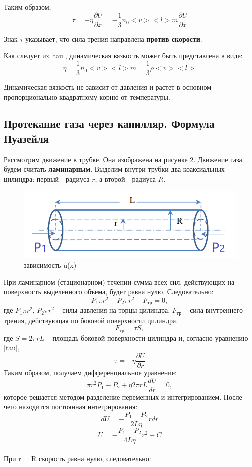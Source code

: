 \documentclass[a4paper,12pt]{article}
\begin{document}
Таким образом, 
\begin{equation}\label{tau}
\tau = -\eta\frac{\partial U}{\partial x} = -\frac{1}{3}n_0<v><l>m\frac{\partial U}{\partial x}
\end{equation}

Знак $\tau$ указывает, что сила трения направлена \textbf{против скорости}.
	
Как следует из \eqref{tau}, динамическая вязкость может быть представлена в виде:
\begin{equation}\label{tau}
\eta = \frac{1}{3}n_0<v><l>m = \frac{1}{3}\rho<v><l>
\end{equation}
	
Динамическая вязкость не зависит от давления и растет в основном пропорционально квадратному корню от температуры.
	
\newpage
\subsection{Протекание газа через капилляр. Формула Пуазейля}
Рассмотрим движение в трубке. Она изображена на рисунке 2. Движение газа будем считать \textbf{ламинарным}. Выделим внутри трубки два коаксиальных цилиндра: первый - радиуса $r$, а второй - радиуса $R$.
	
\begin{figure}[h!]
	\begin{center}
		\includegraphics[scale=0.7]{2}
	\end{center}
	\caption{зависимость u(x)}
\end{figure}

При ламинарном (стационарном) течении сумма всех сил, действующих на поверхность выделенного объема, будет равна нулю. Следовательно:
$$P_1\pi r^2 - P_2\pi r^2 - F_{тр}= 0,$$
где $P_1\pi r^2$, $P_2\pi r^2$ -- силы давления на торцы цилиндра, $F_{тр}$ -- сила внутреннего трения, действующая по боковой поверхности цилиндра.
$$F_{тр} = \tau S,$$
где $S = 2\pi rL$ -- площадь боковой поверхности цилиндра и, согласно уравнению \eqref{tau},
$$\tau = -\eta\frac{\partial U}{\partial r}$$
Таким образом, получаем дифференциальное уравнение:
$$\pi r^2P_1 - P_2 + \eta2\pi rL\frac{dU}{dr} = 0,$$
которое решается методом разделение переменных и интегрированием. После чего находится постоянная интегрирования:
$$dU = -\frac{P_1 - P_2}{2L\eta}rdr$$
$$U = -\frac{P_1 - P_2}{4L\eta}r^2 + C$$
\\
При r = R скорость равна нулю, следовательно:
	
\end{document}
